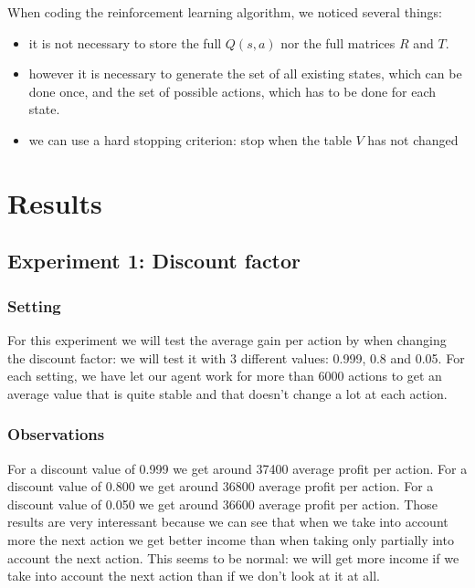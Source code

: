 \documentclass[11pt]{article}
\begin{document}
When coding the reinforcement learning algorithm, we noticed several things: 
\begin{itemize}
\item it is not necessary to store the full $Q(s,a)$ nor the full matrices $R$ and $T$.
\item however it is necessary to generate the set of all existing states, which can be done once, and the set of possible actions, which has to be done for each state.
\item we can use a hard stopping criterion: stop when the table $V$ has not changed
\end{itemize}


\section{Results}

\subsection{Experiment 1: Discount factor}

\subsubsection{Setting}
For this experiment we will test the average gain per action by when changing the discount factor: we will test it with 3 different values: 0.999, 0.8 and 0.05. For each setting, we have let our agent work for more than 6000 actions to get an average value that is quite stable and that doesn't change a lot at each action.

\subsubsection{Observations}
For a discount value of 0.999 we get around 37400 average profit per action.
\newline
For a discount value of 0.800 we get around 36800 average profit per action.
\newline
For a discount value of 0.050 we get around 36600 average profit per action.
\newline
Those results are very interessant because we can see that when we  take into account more the next action we get better income than when taking only partially into account the next action. This seems to be normal: we will get more income if we take into account the next action than if we don't look at it at all. 
\end{document}
